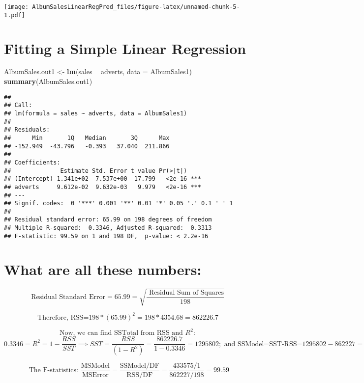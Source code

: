 \documentclass[]{article}
\newenvironment{Shaded}{\begin{snugshade}}{\end{snugshade}}
\newcommand{\KeywordTok}[1]{\textcolor[rgb]{0.13,0.29,0.53}{\textbf{#1}}}
\newcommand{\DataTypeTok}[1]{\textcolor[rgb]{0.13,0.29,0.53}{#1}}
\newcommand{\StringTok}[1]{\textcolor[rgb]{0.31,0.60,0.02}{#1}}
\newcommand{\OperatorTok}[1]{\textcolor[rgb]{0.81,0.36,0.00}{\textbf{#1}}}
\newcommand{\NormalTok}[1]{#1}
\begin{document}
\texttt{[image: AlbumSalesLinearRegPred\_files/figure-latex/unnamed-chunk-5-1.pdf]}

\section{Fitting a Simple Linear
Regression}\label{fitting-a-simple-linear-regression}

\begin{Shaded}
\begin{Highlighting}[]
\NormalTok{AlbumSales.out1 <-}\StringTok{ }\KeywordTok{lm}\NormalTok{(sales }\OperatorTok{~}\StringTok{ }\NormalTok{adverts, }\DataTypeTok{data =}\NormalTok{ AlbumSales1)}
\KeywordTok{summary}\NormalTok{(AlbumSales.out1)}
\end{Highlighting}
\end{Shaded}

\begin{verbatim}
## 
## Call:
## lm(formula = sales ~ adverts, data = AlbumSales1)
## 
## Residuals:
##      Min       1Q   Median       3Q      Max 
## -152.949  -43.796   -0.393   37.040  211.866 
## 
## Coefficients:
##              Estimate Std. Error t value Pr(>|t|)    
## (Intercept) 1.341e+02  7.537e+00  17.799   <2e-16 ***
## adverts     9.612e-02  9.632e-03   9.979   <2e-16 ***
## ---
## Signif. codes:  0 '***' 0.001 '**' 0.01 '*' 0.05 '.' 0.1 ' ' 1
## 
## Residual standard error: 65.99 on 198 degrees of freedom
## Multiple R-squared:  0.3346, Adjusted R-squared:  0.3313 
## F-statistic: 99.59 on 1 and 198 DF,  p-value: < 2.2e-16
\end{verbatim}

\section{What are all these numbers:}\label{what-are-all-these-numbers}

\[ \mbox{Residual Standard Error} = 65.99 = \sqrt{\frac{ \mbox{ Residual Sum of Squares}}{198} } \]

\[ \mbox{Therefore,  RSS=}  198* (65.99)^2 = 198*4354.68=862226.7\]

\[ \mbox{Now, we can find SSTotal from RSS and } R^2: \]
\[0.3346=R^2=1-\frac{RSS}{SST} \implies SST= \frac{RSS}{(1-R^2)}= \frac{862226.7}{1-0.3346}=1295802;  \mbox{   and  SSModel=SST-RSS=}1295802-862227=433575  \]

\[ \mbox{ The F-statistics: } \frac{ \mbox{MSModel} }{ \mbox{MSError}} = \frac{ \mbox{SSModel/DF} }{ \mbox{RSS/DF}} =
\frac{ \mbox{433575/1} }{ \mbox{862227/198}} = 99.59 \]
\end{document}
